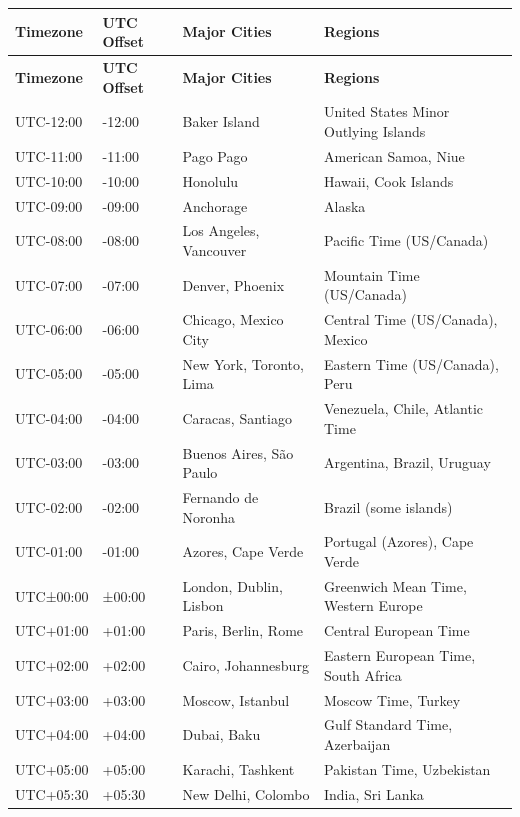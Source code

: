 \documentclass[12pt]{article}
\begin{document}
\begin{longtable}{|p{3cm}|p{2cm}|p{3cm}|p{5cm}|}
\hline
\textbf{Timezone} & \textbf{UTC Offset} & \textbf{Major Cities} & \textbf{Regions} \\
\hline
\endfirsthead
\hline
\textbf{Timezone} & \textbf{UTC Offset} & \textbf{Major Cities} & \textbf{Regions} \\
\hline
\endhead
\hline
\endfoot
\hline
\endlastfoot
UTC-12:00 & -12:00 & Baker Island & United States Minor Outlying Islands \\
\hline
UTC-11:00 & -11:00 & Pago Pago & American Samoa, Niue \\
\hline
UTC-10:00 & -10:00 & Honolulu & Hawaii, Cook Islands \\
\hline
UTC-09:00 & -09:00 & Anchorage & Alaska \\
\hline
UTC-08:00 & -08:00 & Los Angeles, Vancouver & Pacific Time (US/Canada) \\
\hline
UTC-07:00 & -07:00 & Denver, Phoenix & Mountain Time (US/Canada) \\
\hline
UTC-06:00 & -06:00 & Chicago, Mexico City & Central Time (US/Canada), Mexico \\
\hline
UTC-05:00 & -05:00 & New York, Toronto, Lima & Eastern Time (US/Canada), Peru \\
\hline
UTC-04:00 & -04:00 & Caracas, Santiago & Venezuela, Chile, Atlantic Time \\
\hline
UTC-03:00 & -03:00 & Buenos Aires, São Paulo & Argentina, Brazil, Uruguay \\
\hline
UTC-02:00 & -02:00 & Fernando de Noronha & Brazil (some islands) \\
\hline
UTC-01:00 & -01:00 & Azores, Cape Verde & Portugal (Azores), Cape Verde \\
\hline
UTC±00:00 & ±00:00 & London, Dublin, Lisbon & Greenwich Mean Time, Western Europe \\
\hline
UTC+01:00 & +01:00 & Paris, Berlin, Rome & Central European Time \\
\hline
UTC+02:00 & +02:00 & Cairo, Johannesburg & Eastern European Time, South Africa \\
\hline
UTC+03:00 & +03:00 & Moscow, Istanbul & Moscow Time, Turkey \\
\hline
UTC+04:00 & +04:00 & Dubai, Baku & Gulf Standard Time, Azerbaijan \\
\hline
UTC+05:00 & +05:00 & Karachi, Tashkent & Pakistan Time, Uzbekistan \\
\hline
UTC+05:30 & +05:30 & New Delhi, Colombo & India, Sri Lanka \\

\end{longtable}
\end{document}
